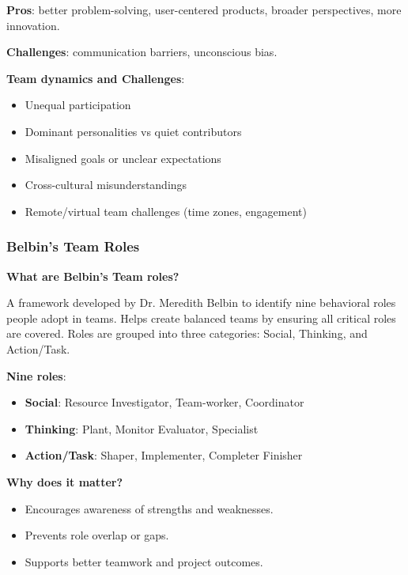 \noindent\textbf{Pros}: better problem-solving, user-centered products, broader perspectives, more innovation.

\noindent\textbf{Challenges}: communication barriers, unconscious bias.

\bigskip

\noindent\textbf{Team dynamics and Challenges}:

\begin{itemize}
    \item Unequal participation
    \item Dominant personalities vs quiet contributors
    \item Misaligned goals or unclear expectations
    \item Cross-cultural misunderstandings
    \item Remote/virtual team challenges (time zones, engagement)
\end{itemize}

\subsubsection{Belbin's Team Roles}

\indent 

\noindent\textbf{What are Belbin's Team roles?}

A framework developed by Dr. Meredith Belbin to identify nine behavioral roles 
people adopt in teams. Helps create balanced teams by ensuring all critical roles are covered. Roles are grouped into three categories: Social, Thinking, and Action/Task.

\bigskip

\noindent\textbf{Nine roles}:

\begin{itemize}
    \item \textbf{Social}: Resource Investigator, Team-worker, Coordinator
    \item \textbf{Thinking}: Plant, Monitor Evaluator, Specialist
    \item \textbf{Action/Task}: Shaper, Implementer, Completer Finisher
\end{itemize}

\bigskip

\noindent\textbf{Why does it matter?}

\begin{itemize}
    \item Encourages awareness of strengths and weaknesses.
    \item Prevents role overlap or gaps.
    \item Supports better teamwork and project outcomes.
\end{itemize}

